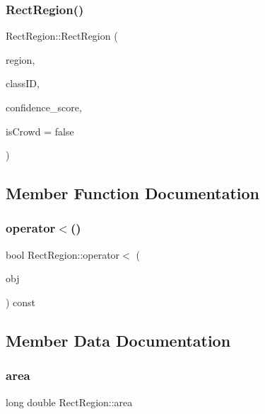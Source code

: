 \subsubsection{\texorpdfstring{Rect\+Region()}{RectRegion()}\hspace{0.1cm}{\footnotesize\ttfamily [3/3]}}
{\footnotesize\ttfamily Rect\+Region\+::\+Rect\+Region (\begin{DoxyParamCaption}\item[{const cv\+::\+Rect\+\_\+$<$ double $>$ \&}]{region,  }\item[{const std\+::string \&}]{class\+ID,  }\item[{const double}]{confidence\+\_\+score,  }\item[{const bool}]{is\+Crowd = {\ttfamily false} }\end{DoxyParamCaption})\hspace{0.3cm}{\ttfamily [inline]}}



\subsection{Member Function Documentation}
\mbox{\label{struct_rect_region_a214aa5e98f4d5e3795e562878bc2dc68}} 
\subsubsection{\texorpdfstring{operator$<$()}{operator<()}}
{\footnotesize\ttfamily bool Rect\+Region\+::operator$<$ (\begin{DoxyParamCaption}\item[{const \hyperlink{struct_rect_region}{Rect\+Region} \&}]{obj }\end{DoxyParamCaption}) const\hspace{0.3cm}{\ttfamily [inline]}}



\subsection{Member Data Documentation}
\mbox{\label{struct_rect_region_a085235a3e876d5d9fd9bf22775e3f46c}} 
\subsubsection{\texorpdfstring{area}{area}}
{\footnotesize\ttfamily long double Rect\+Region\+::area}

